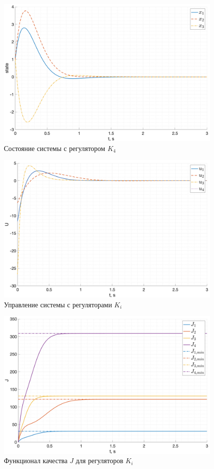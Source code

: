 \begin{figure}[ht!]
    \centering
    \includegraphics[width=\textwidth]{media/plots/lqr_task1/state_4.png}
    \caption{Состояние системы с регулятором $K_4$}
    \label{fig:task1_x_4}
\end{figure}
\begin{figure}[ht!]
    \centering
    \includegraphics[width=\textwidth]{media/plots/lqr_task1/u_cmp.png}
    \caption{Управление системы с регуляторами $K_i$}
    \label{fig:task1_u}
\end{figure}
\begin{figure}[ht!]
    \centering
    \includegraphics[width=\textwidth]{media/plots/lqr_task1/j_cmp.png}
    \caption{Функционал качества $J$ для регуляторов $K_i$}
    \label{fig:task1_j}
\end{figure}
